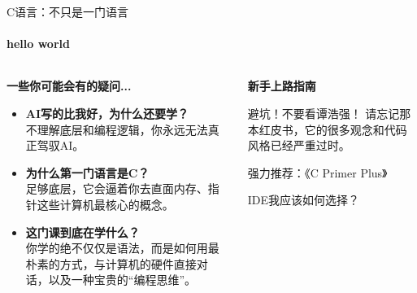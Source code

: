 \documentclass{beamer}
\begin{document}
\begin{frame}{C语言：不只是一门语言}
\framesubtitle{hello world}
    \begin{columns}[T]
        \begin{column}{0.5\textwidth}
            \Large\textbf{一些你可能会有的疑问...}\\            \vspace{0.3cm}
            \begin{itemize}
                \item \textbf{AI写的比我好，为什么还要学？} \\
                \small 不理解底层和编程逻辑，你永远无法真正驾驭AI。
                
                \item \textbf{为什么第一门语言是C？} \\
                \small 足够底层，它会逼着你去直面内存、指针这些计算机最核心的概念。
                
                \item \textbf{这门课到底在学什么？} \\
                \small \alert{你学的绝不仅仅是语法}，而是如何用最朴素的方式，与计算机的硬件直接对话，以及一种宝贵的\alert{“编程思维”}。
            \end{itemize}
        \end{column}
        
        \begin{column}{0.5\textwidth}
            \Large\textbf{新手上路指南}
            \vspace{0.5cm}
            
            \begin{alertblock}{避坑！不要看谭浩强！}
                请忘记那本红皮书，它的很多观念和代码风格已经严重过时。
            \end{alertblock}
            
            \begin{alertblock}{强力推荐：《C Primer Plus》}
            \end{alertblock}

            IDE我应该如何选择？

        \end{column}
    \end{columns}

\end{frame}
\end{document}
